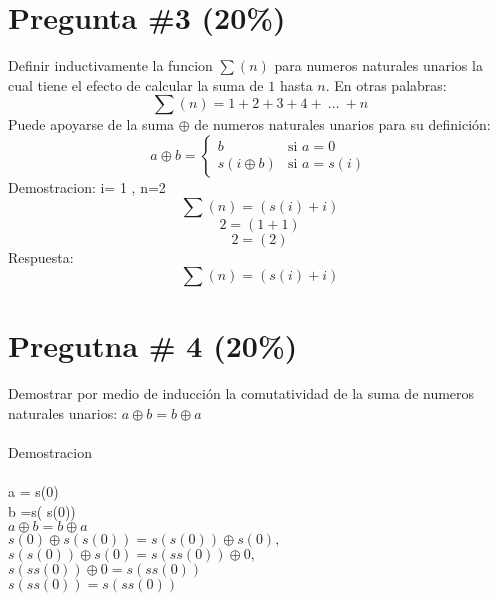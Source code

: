 \documentclass[10pt,a4paper]{article}
\begin{document}
\section*{Pregunta \#3 (20\%)}
Definir inductivamente la funcion $\sum(n)$ para numeros naturales unarios la cual tiene
el efecto de calcular la suma de $1$ hasta $n$. En otras palabras:
\[
        \sum(n)=1+2+3+4+\ \ldots\ +n
\]
Puede apoyarse de la suma $\oplus$ de numeros naturales unarios para su definici\'on:
\[
        a\oplus b =
                \left\{
                        \begin{array}{ll}
                                b  & \mbox{si } a = 0 \\
                                s(i\oplus b) & \mbox{si } a = s(i)
                        \end{array}
                \right.
\]
Demostracion:  i= 1 , n=2 \\
        \[ \sum(n)=(s(i) + i) \]
        \[ 2  =  (1+1)  \]
        \[ 2  =  (2)  \]
    Respuesta:  \[ \sum(n)=(s(i) + i) \]
    
\section*{Pregutna \# 4 (20\%)}
Demostrar por medio de inducci\'on la comutatividad de la suma de
numeros naturales unarios: $a\oplus b = b\oplus a$ \\ \\
Demostracion\\ \\
a = s(0)\\
b =s( s(0))\\
$a\oplus b = b\oplus a$ \\
$s(0) \oplus s( s(0)) = s(s(0)) \oplus  s(0), $ \\
$s(s(0)) \oplus  s(0) = s(ss(0)) \oplus  0, $\\
$s(ss(0)) \oplus  0 = s(ss(0))  $\\
$s(ss(0)) = s(ss(0))  $\\
\end{document}
